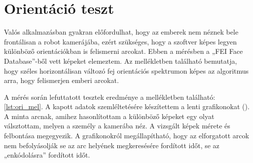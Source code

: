  \clearpage
\section{Orientáció teszt}
Valós alkalmazásban gyakran előfordulhat, hogy az emberek nem néznek bele frontálisan a robot kamerájába, ezért szükséges, hogy a szoftver képes legyen különböző orientációkban is felismerni arcokat. Ebben a mérésben a „FEI Face Database”\cite{artc41}-ből vett képeket elemeztem. Az mellékletben található  bemutatja, hogy széles horizontálisan változó fej orientációs spektrumon képes az algoritmus arra, hogy felismerjen emberi arcokat.

A mérés során lefuttatott tesztek eredménye a mellékletben található: \ref{lst:ori_mel}. A kapott adatok szemléltetésére készítettem a lenti grafikonokat (). A minta arcnak, amihez hasonlítottam a különböző képeket egy olyat válsztottam, melyen a személy a kamerába néz. A vizsgált képek mérete és felbontása megegyezik. A grafikonokról megállapítható, hogy az elforgatott arcok nem befolyásolják se az arc helyének megkeresésére fordított időt, se az „enkódolásra” fordított időt. 
